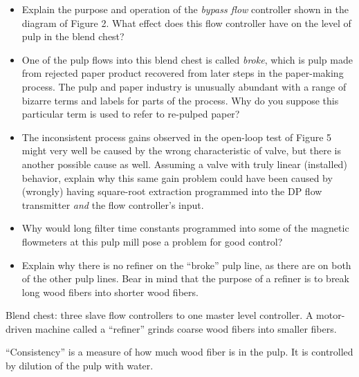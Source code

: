 \begin{itemize}
\item{} Explain the purpose and operation of the {\it bypass flow} controller shown in the diagram of Figure 2.  What effect does this flow controller have on the level of pulp in the blend chest?
\item{} One of the pulp flows into this blend chest is called {\it broke}, which is pulp made from rejected paper product recovered from later steps in the paper-making process.  The pulp and paper industry is unusually abundant with a range of bizarre terms and labels for parts of the process.  Why do you suppose this particular term is used to refer to re-pulped paper?
\item{} The inconsistent process gains observed in the open-loop test of Figure 5 might very well be caused by the wrong characteristic of valve, but there is another possible cause as well.  Assuming a valve with truly linear (installed) behavior, explain why this same gain problem could have been caused by (wrongly) having square-root extraction programmed into the DP flow transmitter {\it and} the flow controller's input.
\item{} Why would long filter time constants programmed into some of the magnetic flowmeters at this pulp mill pose a problem for good control?
\item{} Explain why there is no refiner on the ``broke'' pulp line, as there are on both of the other pulp lines.  Bear in mind that the purpose of a refiner is to break long wood fibers into shorter wood fibers.
\end{itemize}














Blend chest: three slave flow controllers to one master level controller.  A motor-driven machine called a ``refiner'' grinds coarse wood fibers into smaller fibers.  

\vskip 10pt

``Consistency'' is a measure of how much wood fiber is in the pulp.  It is controlled by dilution of the pulp with water.

\vskip 10pt

